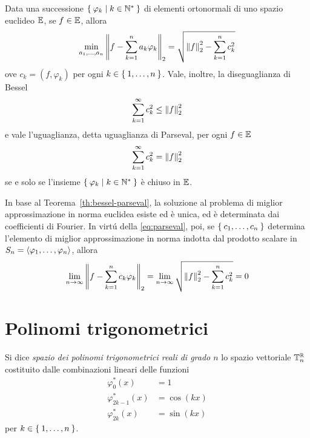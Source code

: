 	\begin{teorema}\label{th:bessel-parseval}
		Data una successione \(\Set{\varphi_k | k \in \mathbb{N}^*}\) di elementi ortonormali di uno spazio euclideo \(\mathbb{E}\), se \(f \in \mathbb{E}\), allora
		\begin{equation}\label{eq:bessel-parseval}
			\min_{a_1, \dots, a_n} \norm{f - \sum_{k = 1}^n a_k \varphi_k}_2 = \sqrt{\norm{f}_2^2 - \sum_{k = 1}^n c_k^2}
		\end{equation}
		ove \(c_k = (f, \varphi_k)\) per ogni \(k \in \Set{1, \dots, n}\). Vale, inoltre, la diseguaglianza di Bessel
		\begin{equation}\label{eq:bessel}
			\sum_{k = 1}^\infty c_k^2 \le \norm{f}_2^2
		\end{equation}
		e vale l'uguaglianza, detta uguaglianza di Parseval, per ogni \(f \in \mathbb{E}\)
		\begin{equation}\label{eq:parseval}
			\sum_{k = 1}^\infty c_k^2 = \norm{f}_2^2
		\end{equation}
		se e solo se l'insieme \(\Set{\varphi_k | k \in \mathbb{N}^*}\) è chiuso in \(\mathbb{E}\).
	\end{teorema}

	\begin{osservazione}
		In base al Teorema~\ref{th:bessel-parseval}, la soluzione al problema di miglior approssimazione in norma euclidea esiste ed è unica, ed è determinata dai coefficienti di Fourier. In virtú della \eqref{eq:parseval}, poi, se \(\Set{c_1, \dots, c_n}\) determina l'elemento di miglior approssimazione in norma indotta dal prodotto scalare in \(S_n = \Braket{\varphi_1, \dots, \varphi_n}\), allora
		\begin{equation*}
			\lim_{n \to \infty} \norm{f -  \sum_{k = 1}^n c_k \varphi_k}_2 = \lim_{n \to \infty} \sqrt{\norm{f}_2^2 - \sum_{k = 1}^n c_k^2} = 0
		\end{equation*}
	\end{osservazione}

\section{Polinomi trigonometrici}
	
	\begin{definizione}\label{def:polin-trig-reali}
		Si dice \emph{spazio dei polinomi trigonometrici reali di grado \(n\)} lo spazio vettoriale \(\mathbb{T}_n^\mathbb{R}\) costituito dalle combinazioni lineari delle funzioni
		\begin{subequations}
			\begin{align}\label{eq:polin-trig-reali}
				\varphi_0^* (x)         & = 1          \\
				\varphi_{2 k - 1}^* (x) & = \cos (k x) \\
				\varphi_{2 k}^* (x)     & = \sin (k x)
			\end{align}
		\end{subequations}
		per \(k \in \Set{1, \dots, n}\).
	\end{definizione}

